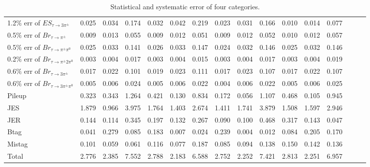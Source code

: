 \begin{sidewaystable}[p]
\begin{tabular}{|l|ccc|ccc|ccc|ccc|ccc|}
  1.2$\%$ err of $ES_{\tau\to3\pi^\pm}$      & 0.025 & 0.034 & 0.174 & 0.032 & 0.042 & 0.219 & 0.023 & 0.031 & 0.166 & 0.010 & 0.014 & 0.077 \\ 
  0.5$\%$ err of $Br_{\tau\to\pi^\pm}$       & 0.009 & 0.013 & 0.055 & 0.009 & 0.012 & 0.051 & 0.009 & 0.012 & 0.052 & 0.010 & 0.012 & 0.057 \\ 
  0.5$\%$ err of $Br_{\tau\to\pi^\pm\pi^0}$  & 0.025 & 0.033 & 0.141 & 0.026 & 0.033 & 0.147 & 0.024 & 0.032 & 0.146 & 0.025 & 0.032 & 0.146 \\ 
  0.2$\%$ err of $Br_{\tau\to\pi^\pm2\pi^0}$ & 0.003 & 0.004 & 0.017 & 0.003 & 0.004 & 0.015 & 0.003 & 0.004 & 0.017 & 0.003 & 0.004 & 0.019 \\ 
  0.6$\%$ err of $Br_{\tau\to3\pi^\pm}$      & 0.017 & 0.022 & 0.101 & 0.019 & 0.023 & 0.111 & 0.017 & 0.023 & 0.107 & 0.017 & 0.022 & 0.107 \\ 
  0.6$\%$ err of $Br_{\tau\to3\pi^\pm\pi^0}$ & 0.005 & 0.006 & 0.024 & 0.005 & 0.006 & 0.022 & 0.004 & 0.006 & 0.022 & 0.005 & 0.006 & 0.025 \\ 
  Pileup                                     & 0.323 & 0.343 & 1.264 & 0.421 & 0.130 & 0.834 & 0.172 & 0.056 & 1.107 & 0.468 & 0.105 & 0.945 \\ 
  JES                                        & 1.879 & 0.966 & 3.975 & 1.764 & 1.403 & 2.674 & 1.411 & 1.741 & 3.879 & 1.508 & 1.597 & 2.946 \\ 
  JER                                        & 0.144 & 0.114 & 0.345 & 0.197 & 0.132 & 0.267 & 0.090 & 0.100 & 0.468 & 0.317 & 0.143 & 0.047 \\ 
  Btag                                       & 0.041 & 0.279 & 0.085 & 0.183 & 0.007 & 0.024 & 0.239 & 0.004 & 0.012 & 0.084 & 0.205 & 0.170 \\ 
  Mistag                                     & 0.101 & 0.059 & 0.061 & 0.116 & 0.077 & 0.187 & 0.085 & 0.094 & 0.138 & 0.150 & 0.142 & 0.136 \\ 
  \hline
  Total                                      & 2.776 & 2.385 & 7.552 & 2.788 & 2.183 & 6.588 & 2.752 & 2.252 & 7.421 & 2.813 & 2.251 & 6.957 \\ 
  \hline
  \end{tabular}
  \caption{ Statistical and systematic error of four categories. }
  \label{tab:syst_alt}
\end{sidewaystable}
